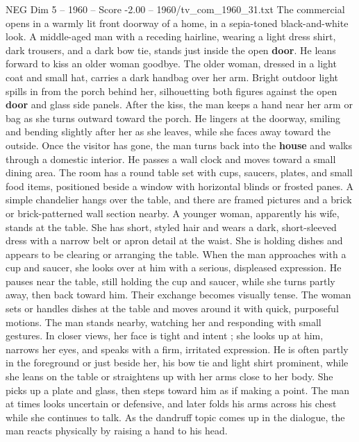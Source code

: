 \begin{textsample}{NEG Dim 5 – 1960 – Score -2.00 – 1960/tv\_com\_1960\_31.txt}  \label{ex:f5_neg_042}
The commercial opens in a warmly lit front doorway of a home, in a sepia-toned black-and-white look.
A middle-aged man with a receding hairline, wearing a light dress shirt, dark trousers, and a dark bow tie, stands just inside the open \textbf{door}.
He leans forward to kiss an older woman goodbye.
The older woman, dressed in a light coat and small hat, carries a dark handbag over her arm.
Bright outdoor light spills in from the porch behind her, silhouetting both figures against the open \textbf{door} and glass side panels.
After the kiss, the man keeps a hand near her arm or bag as she turns outward toward the porch.
He lingers at the doorway, smiling and bending slightly after her as she leaves, while she faces away toward the outside.
Once the visitor has gone, the man turns back into the \textbf{house} and walks through a domestic interior.
He passes a wall clock and moves toward a small dining area.
The room has a round table set with cups, saucers, plates, and small food items, positioned beside a window with horizontal blinds or frosted panes.
A simple chandelier hangs over the table, and there are framed pictures and a brick or brick-patterned wall section nearby.
A younger woman, apparently his wife, stands at the table.
She has short, styled hair and wears a dark, short-sleeved dress with a narrow belt or apron detail at the waist.
She is holding dishes and appears to be clearing or arranging the table.
When the man approaches with a cup and saucer, she looks over at him with a serious, displeased expression.
He pauses near the table, still holding the cup and saucer, while she turns partly away, then back toward him.
Their exchange becomes visually tense.
The woman sets or handles dishes at the table and moves around it with quick, purposeful motions.
The man stands nearby, watching her and responding with small gestures.
In closer views, her face is tight and intent ; she looks up at him, narrows her eyes, and speaks with a firm, irritated expression.
He is often partly in the foreground or just beside her, his bow tie and light shirt prominent, while she leans on the table or straightens up with her arms close to her body.
She picks up a plate and glass, then steps toward him as if making a point.
The man at times looks uncertain or defensive, and later folds his arms across his chest while she continues to talk.
As the dandruff topic comes up in the dialogue, the man reacts physically by raising a hand to his head.

\end{textsample}
